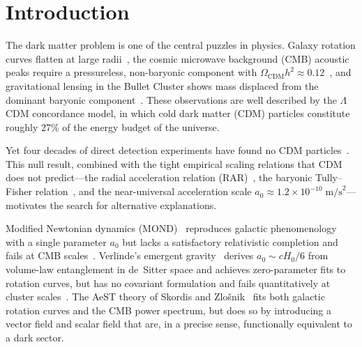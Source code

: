 \documentclass[prd,twocolumn,superscriptaddress,longbibliography,floatfix]{revtex4-2}
\begin{document}
\maketitle

\section{Introduction}
\label{sec:intro}

The dark matter problem is one of the central puzzles in
physics.  Galaxy rotation curves flatten at large
radii~\cite{Rubin1980}, the cosmic microwave background (CMB)
acoustic peaks require a pressureless, non-baryonic component
with $\Omega_{\mathrm{CDM}} h^2 \approx 0.12$~\cite{Planck2018},
and gravitational lensing in the Bullet Cluster shows mass
displaced from the dominant baryonic component~\cite{Clowe2006}.
These observations are well described by the
$\Lambda$CDM concordance model, in which cold dark matter
(CDM) particles constitute roughly 27\% of the energy budget
of the universe.

Yet four decades of direct detection experiments have found no
CDM particles~\cite{Schumann2019}.  This null result, combined
with the tight empirical scaling relations that CDM does not
predict---the radial acceleration relation
(RAR)~\cite{McGaughRAR2016}, the baryonic Tully--Fisher
relation~\cite{McGaughBTFR2000}, and the near-universal
acceleration scale $a_0 \approx 1.2 \times 10^{-10}\;
\mathrm{m/s}^2$---motivates the search for alternative
explanations.

Modified Newtonian dynamics (MOND)~\cite{Milgrom1983}
reproduces galactic phenomenology with a single parameter
$a_0$ but lacks a satisfactory relativistic completion
and fails at CMB scales~\cite{Skordis2021}.
Verlinde's emergent gravity~\cite{Verlinde2016} derives
$a_0 \sim cH_0/6$ from volume-law entanglement in
de~Sitter space and achieves zero-parameter fits to
rotation curves, but has no covariant formulation and
fails quantitatively at cluster scales~\cite{Ettori2019}.
The AeST theory of Skordis and
Zlo\v{s}nik~\cite{Skordis2021} fits both galactic rotation
curves and the CMB power spectrum, but does so by introducing
a vector field and scalar field that are, in a precise sense,
functionally equivalent to a dark sector.
\end{document}
